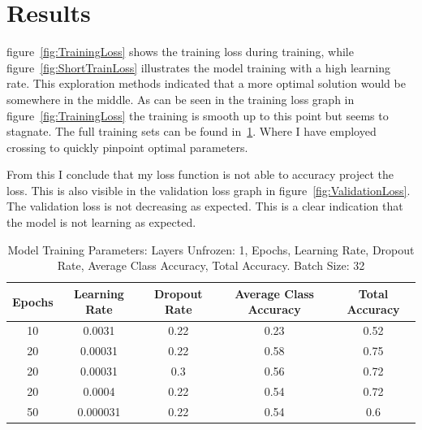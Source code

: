 \documentclass{article}
\begin{document}
\section{Results}

figure~\ref{fig:TrainingLoss} shows the training loss during training, while figure~\ref{fig:ShortTrainLoss} illustrates the model training with a high learning rate. This exploration methods indicated that a more optimal solution would be somewhere in the middle. As can be seen in the training loss graph in figure~\ref{fig:TrainingLoss} the training is smooth up to this point but seems to stagnate. The full training sets can be found in~\ref{tab:model_parameters}. Where I have employed crossing to quickly pinpoint optimal parameters. 

From this I conclude that my loss function is not able to accuracy project the loss. This is also visible in the validation loss graph in figure~\ref{fig:ValidationLoss}. The validation loss is not decreasing as expected. This is a clear indication that the model is not learning as expected.

\begin{table}[ht]
    \centering
    \begin{tabular}{ccccc}
        \hline
        \textbf{Epochs} & \textbf{Learning Rate} & \textbf{Dropout Rate} & \textbf{Average Class Accuracy} & \textbf{Total Accuracy} \\
        \hline
        10 & 0.0031 & 0.22 & 0.23 & 0.52 \\
        20 & 0.00031 & 0.22 & 0.58 & 0.75 \\
        20 & 0.00031 & 0.3 & 0.56 & 0.72 \\
        20 & 0.0004 & 0.22 & 0.54 & 0.72 \\
        50 & 0.000031 & 0.22 & 0.54 & 0.6 \\
        \hline
    \end{tabular}
    \caption{Model Training Parameters: Layers Unfrozen: 1, Epochs, Learning Rate, Dropout Rate, Average Class Accuracy, Total Accuracy. Batch Size: 32}
    \label{tab:model_parameters}
\end{table}
\end{document}
